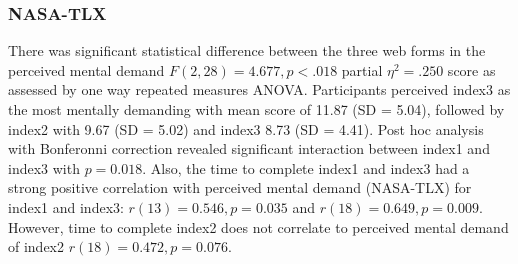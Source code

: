 \documentclass[../main/Feedback.tex]{subfiles}
\begin{document}
		\subsubsection{NASA-TLX}
		There was significant statistical difference between the three web forms in the perceived mental demand $F(2,28)=4.677, p<.018$ partial $\eta^{2}=.250$ score as assessed by one way repeated measures ANOVA. Participants perceived index3 as the most mentally demanding with mean score of 11.87 (SD = 5.04), followed by index2 with 9.67 (SD = 5.02) and index3 8.73 (SD = 4.41). Post hoc analysis with Bonferonni correction revealed significant interaction between index1 and index3 with $p=0.018$.
		Also, the time to complete index1 and index3 had a strong positive correlation with perceived mental demand (NASA-TLX) for index1 and index3: $r(13)=0.546, p=0.035$ and $r(18)=0.649, p=0.009$. However, time to complete index2 does not correlate to perceived mental demand of index2 $r(18)=0.472, p=0.076$.
		
%		

		
		
\end{document}
